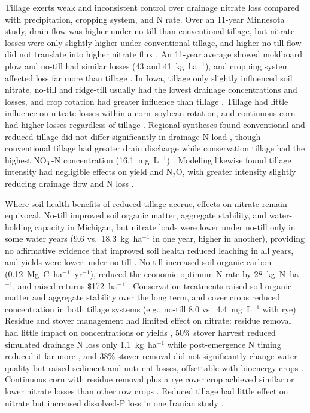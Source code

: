 Tillage exerts weak and inconsistent control over drainage nitrate loss compared with precipitation, cropping system, and N rate. Over an 11-year Minnesota study, drain flow was higher under no-till than conventional tillage, but nitrate losses were only slightly higher under conventional tillage, and higher no-till flow did not translate into higher nitrate flux \parencite{RANDALL1995}. An 11-year average showed moldboard plow and no-till had similar losses (43 and 41~kg~ha$^{-1}$), and cropping system affected loss far more than tillage \parencite{Randall2001}. In Iowa, tillage only slightly influenced soil nitrate, no-till and ridge-till usually had the lowest drainage concentrations and losses, and crop rotation had greater influence than tillage \parencite{Weed1996}. Tillage had little influence on nitrate losses within a corn--soybean rotation, and continuous corn had higher losses regardless of tillage \parencite{Kanwar1997}. Regional syntheses found conventional and reduced tillage did not differ significantly in drainage N load \parencite{Zhao2016}, though conventional tillage had greater drain discharge while conservation tillage had the highest NO$_3^-$-N concentration (16.1~mg~L$^{-1}$) \parencite{Hertzberger2019}. Modeling likewise found tillage intensity had negligible effects on yield and N$_2$O, with greater intensity slightly reducing drainage flow and N loss \parencite{Wang2016b}.

Where soil-health benefits of reduced tillage accrue, effects on nitrate remain equivocal. No-till improved soil organic matter, aggregate stability, and water-holding capacity in Michigan, but nitrate loads were lower under no-till only in some water years (9.6 vs.\ 18.3~kg~ha$^{-1}$ in one year, higher in another), providing no affirmative evidence that improved soil health reduced leaching in all years, and yields were lower under no-till \parencite{Masri2024}. No-till increased soil organic carbon (0.12~Mg~C~ha$^{-1}$~yr$^{-1}$), reduced the economic optimum N rate by 28~kg~N~ha$^{-1}$, and raised returns \$172~ha$^{-1}$ \parencite{Cassman2025}. Conservation treatments raised soil organic matter and aggregate stability over the long term, and cover crops reduced concentration in both tillage systems (e.g., no-till 8.0 vs.\ 4.4~mg~L$^{-1}$ with rye) \parencite{Waring2024}. Residue and stover management had limited effect on nitrate: residue removal had little impact on concentrations or yields \parencite{Dougherty2020}, 50\% stover harvest reduced simulated drainage N loss only 1.1~kg~ha$^{-1}$ while post-emergence N timing reduced it far more \parencite{Malone2019}, and 38\% stover removal did not significantly change water quality but raised sediment and nutrient losses, offsettable with bioenergy crops \parencite{Guo2018}. Continuous corn with residue removal plus a rye cover crop achieved similar or lower nitrate losses than other row crops \parencite{Daigh2015b}. Reduced tillage had little effect on nitrate but increased dissolved-P loss in one Iranian study \parencite{Farahani2020}.

